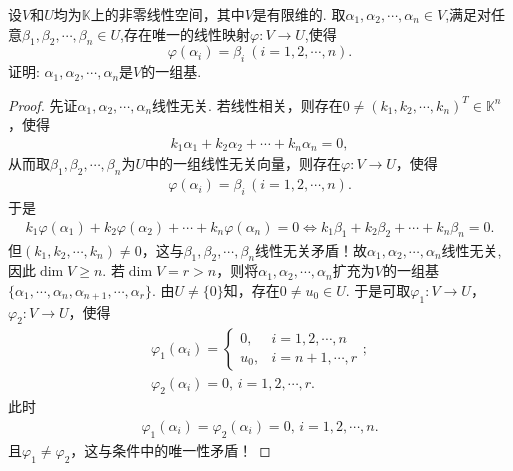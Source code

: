 \documentclass[../../main.tex]{subfiles}
\begin{document}
\begin{example}
设$V$和$U$均为$\mathbb{K}$上的非零线性空间，其中$V$是有限维的. 取$\alpha_1,\alpha_2,\cdots,\alpha_n \in V$,满足对任意$\beta_1,\beta_2,\cdots,\beta_n \in U$,存在唯一的线性映射$\varphi:V \to U$,使得
$$\varphi(\alpha_i)=\beta_i\ (i=1,2,\cdots,n).$$
证明: $\alpha_1,\alpha_2,\cdots,\alpha_n$是$V$的一组基.
\end{example}
\begin{proof}
先证$\alpha_1,\alpha_2,\cdots,\alpha_n$线性无关. 若线性相关，则存在$0 \ne (k_1,k_2,\cdots,k_n)^T \in \mathbb{K}^n$，使得
\begin{align*}
k_1\alpha_1 + k_2\alpha_2 + \cdots + k_n\alpha_n = 0,
\end{align*}
从而取$\beta_1,\beta_2,\cdots,\beta_n$为$U$中的一组线性无关向量，则存在$\varphi:V \rightarrow U$，使得
\begin{align*}
\varphi(\alpha_i) = \beta_i \, (i=1,2,\cdots,n).
\end{align*}
于是
\begin{align*}
k_1\varphi(\alpha_1) + k_2\varphi(\alpha_2) + \cdots + k_n\varphi(\alpha_n) = 0 \Longleftrightarrow k_1\beta_1 + k_2\beta_2 + \cdots + k_n\beta_n = 0.
\end{align*}
但$(k_1,k_2,\cdots,k_n) \ne 0$，这与$\beta_1,\beta_2,\cdots,\beta_n$线性无关矛盾！故$\alpha_1,\alpha_2,\cdots,\alpha_n$线性无关,
因此$\dim V \geqslant n$. 若$\dim V = r > n$，则将$\alpha_1,\alpha_2,\cdots,\alpha_n$扩充为$V$的一组基$\{\alpha_1,\cdots,\alpha_n,\alpha_{n+1},\cdots,\alpha_r\}$.
由$U \ne \{0\}$知，存在$0 \ne u_0 \in U$. 于是可取$\varphi_1:V \rightarrow U$，$\varphi_2:V \rightarrow U$，使得
\begin{gather*}
\varphi_1(\alpha_i) = \begin{cases} 
0, & i=1,2,\cdots,n \\
u_0, & i=n+1,\cdots,r 
\end{cases};
\\
\varphi_2(\alpha_i) = 0, \, i=1,2,\cdots,r.
\end{gather*}
此时
\begin{align*}
\varphi_1(\alpha_i) = \varphi_2(\alpha_i) = 0, \, i=1,2,\cdots,n.
\end{align*}
且$\varphi_1 \ne \varphi_2$，这与条件中的唯一性矛盾！

\end{proof}
\end{document}
